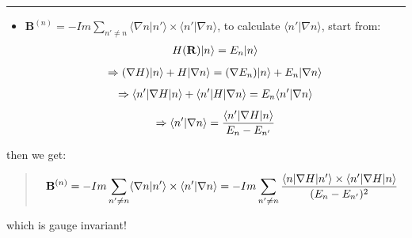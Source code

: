 \documentclass[letterpaper,10pt,english]{sphinxmanual}
\begin{document}
\bigskip\hrule{}\bigskip

\begin{itemize}
\item {} 
\(\mathbf{B}^{(n)}=-Im\sum\limits_{n'\neq n}\langle\nabla n|n'\rangle\times\langle n'|\nabla n\rangle\),
to calculate \(\langle n'|\nabla n\rangle\), start from:
\begin{gather}
\begin{split}H(\mathbf{R})|n\rangle=E_n|n\rangle\end{split}\notag
\end{gather}\begin{gather}
\begin{split}\Rightarrow (\nabla H)|n\rangle+H|\nabla n\rangle=(\nabla E_n)|n\rangle+E_n|\nabla n\rangle\end{split}\notag
\end{gather}\begin{gather}
\begin{split}\Rightarrow \langle n'|\nabla H|n\rangle+\langle n'|H|\nabla n\rangle=E_n\langle n'|\nabla n\rangle\end{split}\notag
\end{gather}\begin{gather}
\begin{split}\Rightarrow \langle n'|\nabla n\rangle=\frac{\langle n'|\nabla H|n\rangle}{E_n-E_{n'}}\end{split}\notag
\end{gather}
\end{itemize}

then we get:
\begin{quote}
\begin{gather}
\begin{split}\mathbf{B}^{(n)}=-Im\sum\limits_{n'\neq n}\langle\nabla n|n'\rangle\times\langle n'|\nabla n\rangle=-Im\sum\limits_{n'\neq n}\frac{\langle n|\nabla H|n'\rangle\times\langle n'|\nabla H|n\rangle}{(E_n-E_{n'})^2}\end{split}\notag
\end{gather}\end{quote}

which is gauge invariant!
\end{document}
